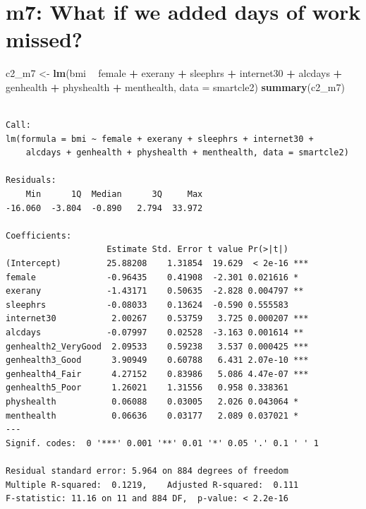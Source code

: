 \documentclass[]{book}
\newenvironment{Shaded}{\begin{snugshade}}{\end{snugshade}}
\newcommand{\KeywordTok}[1]{\textcolor[rgb]{0.13,0.29,0.53}{\textbf{#1}}}
\newcommand{\DataTypeTok}[1]{\textcolor[rgb]{0.13,0.29,0.53}{#1}}
\newcommand{\StringTok}[1]{\textcolor[rgb]{0.31,0.60,0.02}{#1}}
\newcommand{\OperatorTok}[1]{\textcolor[rgb]{0.81,0.36,0.00}{\textbf{#1}}}
\newcommand{\NormalTok}[1]{#1}
\theoremstyle{definition}
\theoremstyle{definition}
\theoremstyle{definition}
\theoremstyle{remark}
\begin{document}
\section{m7: What if we added days of work
missed?}\label{m7-what-if-we-added-days-of-work-missed}

\begin{Shaded}
\begin{Highlighting}[]
\NormalTok{c2_m7 <-}\StringTok{ }\KeywordTok{lm}\NormalTok{(bmi }\OperatorTok{~}\StringTok{ }\NormalTok{female }\OperatorTok{+}\StringTok{ }\NormalTok{exerany }\OperatorTok{+}\StringTok{ }\NormalTok{sleephrs }\OperatorTok{+}\StringTok{ }\NormalTok{internet30 }\OperatorTok{+}\StringTok{ }\NormalTok{alcdays }\OperatorTok{+}\StringTok{ }
\StringTok{                }\NormalTok{genhealth }\OperatorTok{+}\StringTok{ }\NormalTok{physhealth }\OperatorTok{+}\StringTok{ }\NormalTok{menthealth,}
         \DataTypeTok{data =}\NormalTok{ smartcle2)}
\KeywordTok{summary}\NormalTok{(c2_m7)}
\end{Highlighting}
\end{Shaded}

\begin{verbatim}

Call:
lm(formula = bmi ~ female + exerany + sleephrs + internet30 + 
    alcdays + genhealth + physhealth + menthealth, data = smartcle2)

Residuals:
    Min      1Q  Median      3Q     Max 
-16.060  -3.804  -0.890   2.794  33.972 

Coefficients:
                    Estimate Std. Error t value Pr(>|t|)    
(Intercept)         25.88208    1.31854  19.629  < 2e-16 ***
female              -0.96435    0.41908  -2.301 0.021616 *  
exerany             -1.43171    0.50635  -2.828 0.004797 ** 
sleephrs            -0.08033    0.13624  -0.590 0.555583    
internet30           2.00267    0.53759   3.725 0.000207 ***
alcdays             -0.07997    0.02528  -3.163 0.001614 ** 
genhealth2_VeryGood  2.09533    0.59238   3.537 0.000425 ***
genhealth3_Good      3.90949    0.60788   6.431 2.07e-10 ***
genhealth4_Fair      4.27152    0.83986   5.086 4.47e-07 ***
genhealth5_Poor      1.26021    1.31556   0.958 0.338361    
physhealth           0.06088    0.03005   2.026 0.043064 *  
menthealth           0.06636    0.03177   2.089 0.037021 *  
---
Signif. codes:  0 '***' 0.001 '**' 0.01 '*' 0.05 '.' 0.1 ' ' 1

Residual standard error: 5.964 on 884 degrees of freedom
Multiple R-squared:  0.1219,    Adjusted R-squared:  0.111 
F-statistic: 11.16 on 11 and 884 DF,  p-value: < 2.2e-16
\end{verbatim}
\end{document}
